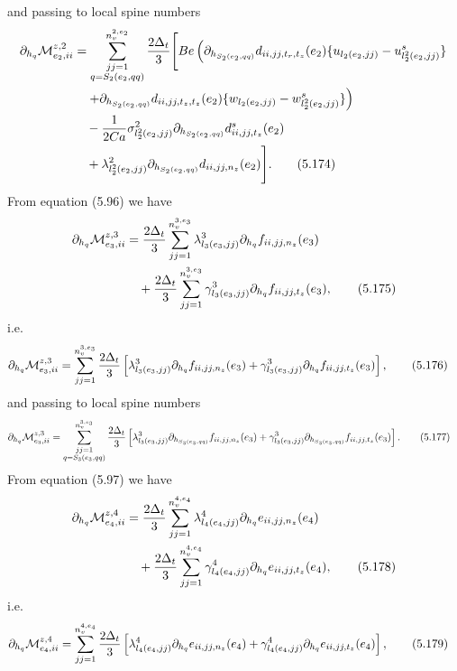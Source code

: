 \documentclass{article}
\begin{document}
and passing to local spine numbers
\begin{align}
\partial_{h_q}\mathcal{M}_{e_2,ii}^{z,2} &= \sum_{\substack{jj=1\\ q=S_2(e_2,qq)}}^{n_v^{2,e_2}} \frac{2\Delta_t}{3} \Bigg[ Be \left( \partial_{h_{S_2(e_2,qq)}} d_{ii,jj,t_r,t_z}(e_2) \{ u_{l_2(e_2,jj)} - u_{l_2^2(e_2,jj)}^s \} \right. \nonumber\\
&\quad \left. + \partial_{h_{S_2(e_2,qq)}} d_{ii,jj,t_z,t_z}(e_2) \{ w_{l_2(e_2,jj)} - w_{l_2^2(e_2,jj)}^s \} \right) \nonumber\\
&\quad - \frac{1}{2Ca} \sigma_{l_2^2(e_2,jj)}^2 \partial_{h_{S_2(e_2,qq)}} d_{ii,jj,t_z}^s(e_2) \nonumber\\
&\quad + \lambda_{l_2^2(e_2,jj)}^2 \partial_{h_{S_2(e_2,qq)}} d_{ii,jj,n_z}(e_2) \Bigg]. \tag{5.174}
\end{align}
From equation (5.96) we have
\begin{align}
\partial_{h_q}\mathcal{M}_{e_3,ii}^{z,3} &= \frac{2\Delta_t}{3} \sum_{jj=1}^{n_v^{3,e_3}} \lambda_{l_3(e_3,jj)}^3 \partial_{h_q} f_{ii,jj,n_z}(e_3) \nonumber\\
&\quad + \frac{2\Delta_t}{3} \sum_{jj=1}^{n_v^{3,e_3}} \gamma_{l_3(e_3,jj)}^3 \partial_{h_q} f_{ii,jj,t_z}(e_3), \tag{5.175}
\end{align}
i.e.
\begin{align}
\partial_{h_q}\mathcal{M}_{e_3,ii}^{z,3} &= \sum_{jj=1}^{n_v^{3,e_3}} \frac{2\Delta_t}{3} \left[ \lambda_{l_3(e_3,jj)}^3 \partial_{h_q} f_{ii,jj,n_z}(e_3) + \gamma_{l_3(e_3,jj)}^3 \partial_{h_q} f_{ii,jj,t_z}(e_3) \right], \tag{5.176}
\end{align}
and passing to local spine numbers
\begin{align}
\partial_{h_q}\mathcal{M}_{e_3,ii}^{z,3} &= \sum_{\substack{jj=1\\ q=S_3(e_3,qq)}}^{n_v^{3,e_3}} \frac{2\Delta_t}{3} \left[ \lambda_{l_3(e_3,jj)}^3 \partial_{h_{S_3(e_3,qq)}} f_{ii,jj,n_z}(e_3) + \gamma_{l_3(e_3,jj)}^3 \partial_{h_{S_3(e_3,qq)}} f_{ii,jj,t_z}(e_3) \right]. \tag{5.177}
\end{align}
From equation (5.97) we have
\begin{align}
\partial_{h_q}\mathcal{M}_{e_4,ii}^{z,4} &= \frac{2\Delta_t}{3} \sum_{jj=1}^{n_v^{4,e_4}} \lambda_{l_4(e_4,jj)}^4 \partial_{h_q} e_{ii,jj,n_z}(e_4) \nonumber\\
&\quad + \frac{2\Delta_t}{3} \sum_{jj=1}^{n_v^{4,e_4}} \gamma_{l_4(e_4,jj)}^4 \partial_{h_q} e_{ii,jj,t_z}(e_4), \tag{5.178}
\end{align}
i.e.
\begin{align}
\partial_{h_q}\mathcal{M}_{e_4,ii}^{z,4} &= \sum_{jj=1}^{n_v^{4,e_4}} \frac{2\Delta_t}{3} \left[ \lambda_{l_4(e_4,jj)}^4 \partial_{h_q} e_{ii,jj,n_z}(e_4) + \gamma_{l_4(e_4,jj)}^4 \partial_{h_q} e_{ii,jj,t_z}(e_4) \right], \tag{5.179}
\end{align}
\end{document}

